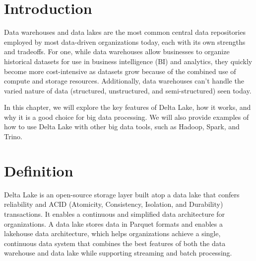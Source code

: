 \section*{Introduction}

Data warehouses and data lakes are the most common central data repositories employed by most data-driven organizations today, each with its own strengths and tradeoffs. For one, while data warehouses allow businesses to organize historical datasets for use in business intelligence (BI) and analytics, they quickly become more cost-intensive as datasets grow because of the combined use of compute and storage resources. Additionally, data warehouses can’t handle the varied nature of data (structured, unstructured, and semi-structured) seen today.

In this chapter, we will explore the key features of Delta Lake, how it works, and why it is a good choice for big data processing. We will also provide examples of how to use Delta Lake with other big data tools, such as Hadoop, Spark, and Trino.
\section{Definition}
Delta Lake is an open-source storage layer built atop a data lake that confers reliability and ACID (Atomicity, Consistency, Isolation, and Durability) transactions. It enables a continuous and simplified data architecture for organizations. A data lake stores data in Parquet formats and enables a lakehouse data architecture, which helps organizations achieve a single, continuous data system that combines the best features of both the data warehouse and data lake while supporting streaming and batch processing.

